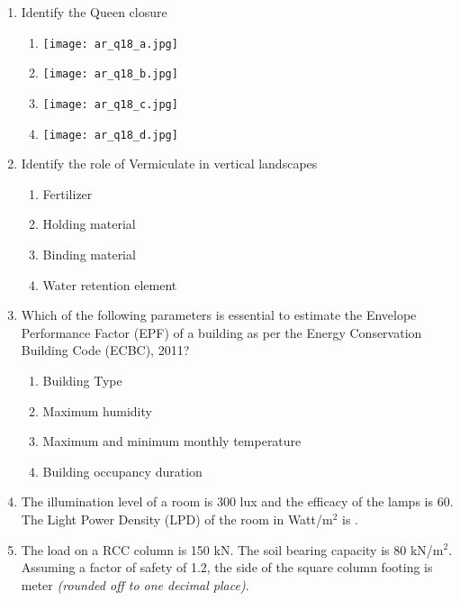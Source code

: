 \documentclass[12pt]{article}
\begin{document}
\begin{enumerate}[label=Q.\arabic*]
	\item Identify the Queen closure
		\begin{multicols}{2}
			\begin{enumerate}
				\item \texttt{[image: ar\_q18\_a.jpg]}
				\item \texttt{[image: ar\_q18\_b.jpg]}
				\item \texttt{[image: ar\_q18\_c.jpg]}
				\item \texttt{[image: ar\_q18\_d.jpg]}
			\end{enumerate}
		\end{multicols}
		\newpage
	\item Identify the role of Vermiculate in vertical landscapes
		\begin{multicols}{2}
			\begin{enumerate}
				\item Fertilizer
				\item Holding material
				\item Binding material
				\item Water retention element
			\end{enumerate}
		\end{multicols}

	\item Which of the following parameters is essential to estimate the Envelope Performance Factor (EPF) of a building as per the Energy Conservation Building Code (ECBC), 2011?
		\begin{multicols}{2}
			\begin{enumerate}
				\item Building Type
				\item Maximum humidity
				\item Maximum and minimum monthly temperature
				\item Building occupancy duration
			\end{enumerate}
		\end{multicols}

	\item The illumination level of a room is 300 lux and the efficacy of the lamps is 60. The Light Power Density (LPD) of the room in Watt/m$^2$ is \underline{\hspace{2cm}}.

	\item The load on a RCC column is 150 kN. The soil bearing capacity is 80 kN/m$^2$. Assuming a factor of safety of 1.2, the side of the square column footing is \underline{\hspace{2cm}} meter \textit{(rounded off to one decimal place)}.


\end{enumerate}
\end{document}
